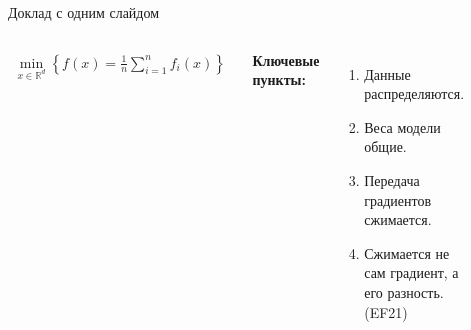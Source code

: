 \documentclass{beamer}
\begin{document}
\newcommand{\R}{\mathbb{R}}
\newcommand{\cC}{\mathcal{C}}
\begin{frame}{Доклад с одним слайдом}
\begin{columns}[c]
\begin{align*}
    \min \limits_{x \in \R^d} \left\{ f(x) = \frac{1}{n} \sum \limits_{i=1}^n f_i(x) \right\}
    \end{align*}

    \textbf{Ключевые пункты:}
    \begin{enumerate}
        \item Данные распределяются.
        \item Веса модели общие.
        \item Передача градиентов сжимается.
        \item Сжимается не сам градиент, а его разность. (EF21)
    \end{enumerate}

\begin{figure}
\includegraphics[width=1.0\textwidth]{output.png}
\end{figure}

\end{columns}

\end{frame}
\end{document}
